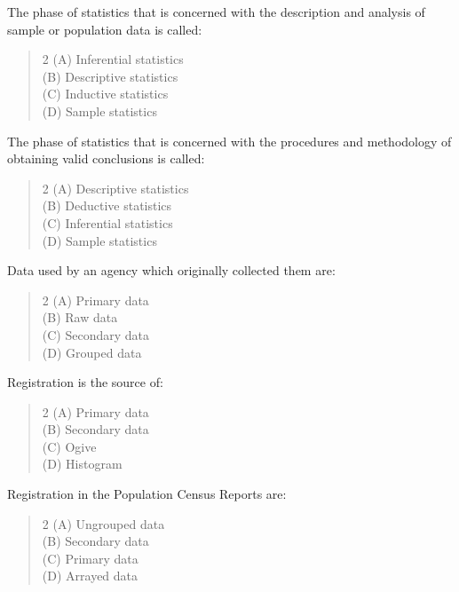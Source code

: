 \documentclass[11pt,a4paper]{article}
\begin{document}
\begin{mcqlist}
\item The phase of statistics that is concerned with the description and analysis of sample or population data is called:
\begin{quote}\begin{multicols}{2}
\noindent (A) Inferential statistics \\
(B) Descriptive statistics \\
(C) Inductive statistics \\
(D) Sample statistics
\end{multicols}\end{quote}

\item The phase of statistics that is concerned with the procedures and methodology of obtaining valid conclusions is called:
\begin{quote}\begin{multicols}{2}
\noindent (A) Descriptive statistics \\
(B) Deductive statistics \\
(C) Inferential statistics \\
(D) Sample statistics
\end{multicols}\end{quote}

\item Data used by an agency which originally collected them are:
\begin{quote}\begin{multicols}{2}
\noindent (A) Primary data \\
(B) Raw data \\
(C) Secondary data \\
(D) Grouped data
\end{multicols}\end{quote}

\item Registration is the source of:
\begin{quote}\begin{multicols}{2}
\noindent (A) Primary data \\
(B) Secondary data \\
(C) Ogive \\
(D) Histogram
\end{multicols}\end{quote}

\item Registration in the Population Census Reports are:
\begin{quote}\begin{multicols}{2}
\noindent (A) Ungrouped data \\
(B) Secondary data \\
(C) Primary data \\
(D) Arrayed data
\end{multicols}\end{quote}


\end{mcqlist}
\end{document}
